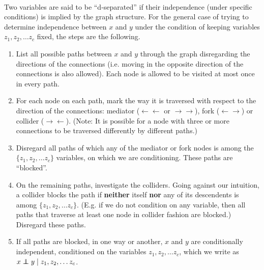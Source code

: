 \\
Two variables are said to be ``d-separated'' if their independence (under specific conditions) is implied by the graph structure. For the general case of trying to determine independence between $x$ and $y$ under the condition of keeping variables $z_1, z_2, \ldots z_c$ fixed, the steps are the following.
\begin{enumerate}
	\item List all possible paths between $x$ and $y$ through the graph disregarding the directions of the connections (i.e. moving in the opposite direction of the connections is also allowed). Each node is allowed to be visited at most once in every path.

	\item For each node on each path, mark the way it is traversed with respect to the direction of the connections: mediator ($\leftarrow\leftarrow$ or $\rightarrow\rightarrow$), fork ($\leftarrow\rightarrow$) or collider ($\rightarrow\leftarrow$). (Note: It is possible for a node with three or more connections to be traversed differently by different paths.)

	\item Disregard all paths of which any of the mediator or fork nodes is among the $\{z_1, z_2, \ldots z_c\}$ variables, on which we are conditioning. These paths are ``blocked''.

	\item On the remaining paths, investigate the colliders. Going against our intuition, a collider blocks the path if {\bf neither} itself {\bf nor} any of its descendents is among $\{z_1, z_2, \ldots z_c\}$. (E.g. if we do not condition on any variable, then all paths that traverse at least one node in collider fashion are blocked.) Disregard these paths.

	\item If all paths are blocked, in one way or another, $x$ and $y$ are conditionally independent, conditioned on the variables $z_1, z_2, \ldots z_c$, which we write as $x \independent y\;|\; z_1, z_2, \ldots z_c$.
\end{enumerate}

